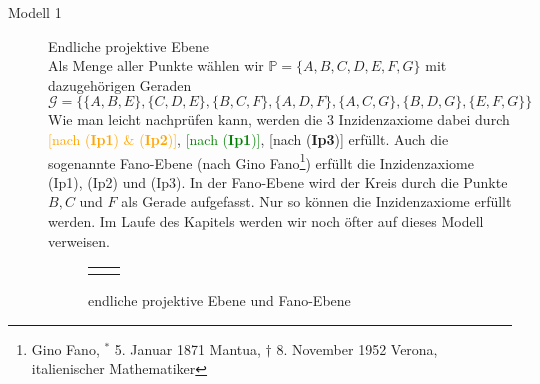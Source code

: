   \begin{description}
      \item[Modell 1] Endliche projektive Ebene \\
          Als Menge aller Punkte wählen wir $\mathbb{P} = \lbrace A,B,C,D,E,F,G \}$ mit dazugehörigen Geraden\\
          $\mathcal{G} = \big \{ \{ A,B,E \}, \{ C,D,E \}, \{ B,C,F \}, \{ A,D,F \},\{ A,C,G \}, \{ B,D,G \}, \{ E,F,G \} \big\}$ \\
          Wie man leicht nachprüfen kann, werden die $3$ Inzidenzaxiome dabei durch 
          \textcolor{orange}{[nach (\textbf{Ip1}) \& (\textbf{Ip2})]}, 
          \textcolor{green}{[nach (\textbf{Ip1})]}, [nach (\textbf{Ip3})] erfüllt. 
          Auch die sogenannte Fano-Ebene (nach Gino Fano\footnote{Gino Fano, 
          $^*$ 5. Januar 1871 Mantua, $\dag$ 8. November 1952 Verona, italienischer Mathematiker}) 
          erfüllt die Inzidenzaxiome (Ip1), (Ip2) und (Ip3). In der Fano-Ebene wird der Kreis 
          durch die Punkte $B,C$ und $F$ als Gerade aufgefasst. Nur so können die Inzidenzaxiome 
          erfüllt werden. Im Laufe des Kapitels werden wir noch öfter auf dieses Modell verweisen.
          
          \begin{figure}[h]
            \begin{tabular}{cc}
              
              &
              
            \end{tabular}
            \caption{endliche projektive Ebene und Fano-Ebene}
          \end{figure}
        

\end{description}
